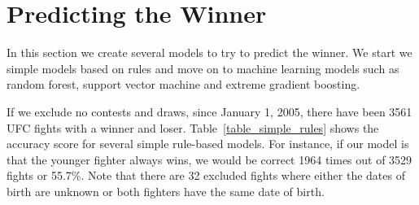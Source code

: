 \clearpage
\section{Predicting the Winner}

In this section we create several models to try to predict
the winner. We start we simple models based on rules
and move on to machine learning models such as
random forest, support vector machine and extreme
gradient boosting.

If we exclude no contests and draws, since January 1, 2005,
there have been 3561 UFC fights with a winner and loser.
Table~\ref{table_simple_rules} shows the accuracy score
for several simple rule-based models. For instance, if
our model is that the younger fighter always wins, we would
be correct 1964 times out of 3529 fights or 55.7\%. Note that
there are 32 excluded fights where either the dates of birth
are unknown or both fighters have the same date of birth.

